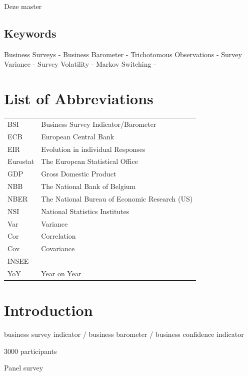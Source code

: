 \documentclass[12pt,a4paper,oneside]{book}
\begin{document}
Deze master


\section*{Keywords}
Business Surveys - 
Business Barometer -
Trichotomous Observations -
Survey Variance - 
Survey Volatility -
Markov Switching - 



\chapter*{List of Abbreviations}

\begin{tabular}{l l}
  BSI   	& Business Survey Indicator/Barometer \\
  ECB   	& European Central Bank \\
  EIR   	& Evolution in individual Responses \\
  Eurostat & The European Statistical Office \\
  GDP   	& Gross Domestic Product \\
  NBB   	& The National Bank of Belgium \\
  NBER  	& The National Bureau of Economic Research (US) \\
  NSI   	& National Statistics Institutes \\
  Var 		& Variance \\
  Cor 		& Correlation \\
  Cov 	  & Covariance \\
  INSEE 	& \\
  YoY & Year on Year
  
\end{tabular}

\tableofcontents

\newpage
\setcounter{page}{0}


\chapter{Introduction}

business survey indicator / business barometer / business confidence indicator

3000 participants

Panel survey
\end{document}
